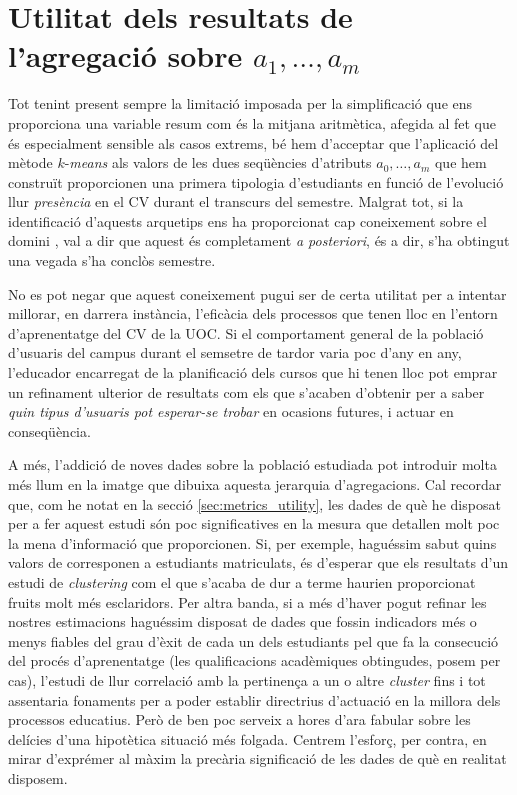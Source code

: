 \documentclass[
	a4paper,
	twoside,
	justified
]{tufte-book}
\begin{document}
\section{Utilitat dels resultats de l'agregació sobre $a_1,\ldots,a_m$}
\label{sec:clustering_utility}

Tot tenint present sempre la limitació imposada per la simplificació que ens proporciona una variable resum com és la mitjana aritmètica, afegida al fet que és especialment sensible als casos extrems, bé hem d'acceptar que l'aplicació del mètode $k$-\emph{means} als valors de les dues seqüències d'atributs $a_0,\ldots,a_m$ que hem construït proporcionen una primera tipologia d'estudiants en funció de l'evolució llur \emph{presència} en el CV durant el transcurs del semestre. Malgrat tot, si la identificació d'aquests arquetips ens ha proporcionat cap coneixement sobre el domini , val a dir que aquest és completament \emph{a posteriori}, és a dir, s'ha obtingut una vegada s'ha conclòs semestre. 

No es pot negar que aquest coneixement pugui ser de certa utilitat per a intentar millorar, en darrera instància, l'eficàcia dels processos que tenen lloc en l'entorn d'aprenentatge del CV de la UOC. Si el comportament general de la població d'usuaris del campus durant el semsetre de tardor varia poc d'any en any, l'educador encarregat de la planificació dels cursos que hi tenen lloc pot emprar un refinament ulterior de resultats com els que s'acaben d'obtenir per a saber \emph{quin tipus d'usuaris pot esperar-se trobar} en ocasions futures, i actuar en conseqüència. 

A més, l'addició de noves dades sobre la població estudiada pot introduir molta més llum en la imatge que dibuixa aquesta jerarquia d'agregacions. Cal recordar que, com he notat en la secció \ref{sec:metrics_utility}, les dades de què he disposat per a fer aquest estudi  són poc significatives en la mesura que detallen molt poc la mena d'informació que proporcionen. Si, per exemple, haguéssim sabut quins valors de  corresponen a estudiants matriculats, és d'esperar que els resultats d'un estudi de \emph{clustering} com el que s'acaba de dur a terme haurien proporcionat fruits molt més esclaridors. Per altra banda, si a més d'haver pogut refinar les nostres estimacions haguéssim disposat de dades que fossin indicadors més o menys fiables del grau d'èxit de cada un dels estudiants pel que fa la consecució del procés d'aprenentatge (les qualificacions acadèmiques obtingudes, posem per cas), l'estudi de llur correlació amb la pertinença a un o altre \emph{cluster} fins i tot assentaria fonaments per a poder establir directrius d'actuació en la millora dels processos educatius. Però de ben poc serveix a hores d'ara fabular sobre les delícies d'una hipotètica situació més folgada. Centrem l'esforç, per contra, en mirar d'exprémer al màxim la precària significació de les dades de què en realitat disposem. 
\end{document}
